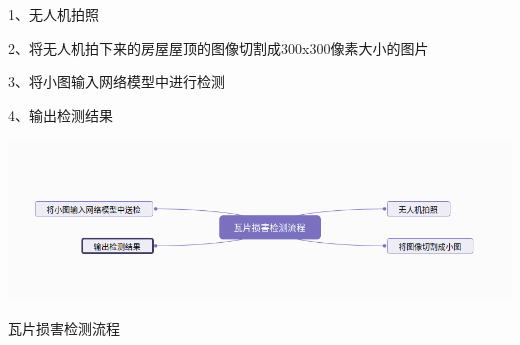 1、无人机拍照

2、将无人机拍下来的房屋屋顶的图像切割成300x300像素大小的图片

3、将小图输入网络模型中进行检测 

4、输出检测结果
\begin{uscfigure}
	\includegraphics[width=\textwidth]{./Pictures/liucheng.png}	
	\caption{瓦片损害检测流程}
	\label{rcnn}
\end{uscfigure}